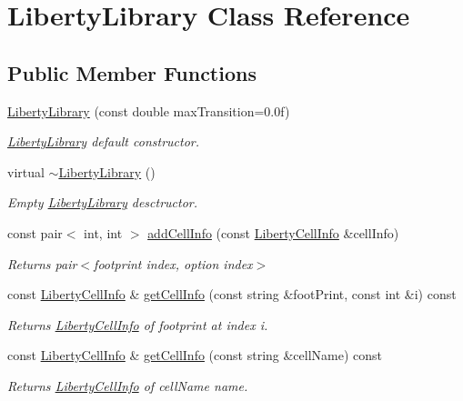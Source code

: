 \hypertarget{classLibertyLibrary}{\section{Liberty\-Library Class Reference}
\label{classLibertyLibrary}
}
\subsection*{Public Member Functions}
\begin{DoxyCompactItemize}
\item 
\hyperlink{classLibertyLibrary_a3b7513ef68e791245f60e16f6b4ee5d4}{Liberty\-Library} (const double max\-Transition=0.\-0f)
\begin{DoxyCompactList}\small\item\em \hyperlink{classLibertyLibrary}{Liberty\-Library} default constructor. \end{DoxyCompactList}\item 
virtual \hyperlink{classLibertyLibrary_ade99b2247c7d5eb9ef885bc4ec57091d}{$\sim$\-Liberty\-Library} ()
\begin{DoxyCompactList}\small\item\em Empty \hyperlink{classLibertyLibrary}{Liberty\-Library} desctructor. \end{DoxyCompactList}\item 
const pair$<$ int, int $>$ \hyperlink{classLibertyLibrary_a4d9ec0ea6af3949878d9b14042e761e6}{add\-Cell\-Info} (const \hyperlink{structLibertyCellInfo}{Liberty\-Cell\-Info} \&cell\-Info)
\begin{DoxyCompactList}\small\item\em Returns pair$<$footprint index, option index$>$ \end{DoxyCompactList}\item 
const \hyperlink{structLibertyCellInfo}{Liberty\-Cell\-Info} \& \hyperlink{classLibertyLibrary_a917ae50f0af17b1b68be754f1ae6dd07}{get\-Cell\-Info} (const string \&foot\-Print, const int \&i) const 
\begin{DoxyCompactList}\small\item\em Returns \hyperlink{structLibertyCellInfo}{Liberty\-Cell\-Info} of footprint at index i. \end{DoxyCompactList}\item 
const \hyperlink{structLibertyCellInfo}{Liberty\-Cell\-Info} \& \hyperlink{classLibertyLibrary_a57c64ca6abd02f1e549eeb25178724c9}{get\-Cell\-Info} (const string \&cell\-Name) const 
\begin{DoxyCompactList}\small\item\em Returns \hyperlink{structLibertyCellInfo}{Liberty\-Cell\-Info} of cell\-Name name. \end{DoxyCompactList}\item 

\end{DoxyCompactItemize}
